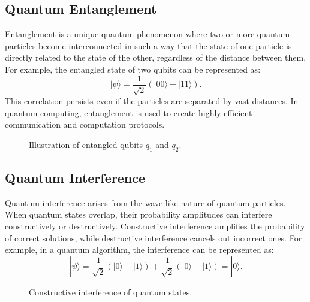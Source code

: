 \documentclass[12pt,a4paper]{report}
\begin{document}
\subsection{Quantum Entanglement} 
Entanglement is a unique quantum phenomenon where two or more quantum particles become interconnected in such a way that the state of one particle is directly related to the state of the other, regardless of the distance between them. For example, the entangled state of two qubits can be represented as:
\[
|\psi\rangle = \frac{1}{\sqrt{2}} \left( |00\rangle + |11\rangle \right).
\]
This correlation persists even if the particles are separated by vast distances. In quantum computing, entanglement is used to create highly efficient communication and computation protocols.

\begin{figure}[H]
    \centering
    \caption{Illustration of entangled qubits \( q_1 \) and \( q_2 \).}
\end{figure}

\subsection{Quantum Interference} 
Quantum interference arises from the wave-like nature of quantum particles. When quantum states overlap, their probability amplitudes can interfere constructively or destructively. Constructive interference amplifies the probability of correct solutions, while destructive interference cancels out incorrect ones. For example, in a quantum algorithm, the interference can be represented as:
\[
|\psi\rangle = \frac{1}{\sqrt{2}} \left( |0\rangle + |1\rangle \right) + \frac{1}{\sqrt{2}} \left( |0\rangle - |1\rangle \right) = |0\rangle.
\]

\begin{figure}[H]
    \centering
    \caption{Constructive interference of quantum states.}
\end{figure}
\end{document}
